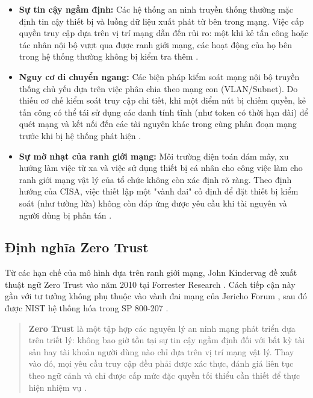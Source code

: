 \begin{itemize}
    \item \textbf{Sự tin cậy ngầm định:} Các hệ thống an ninh truyền thống thường mặc định tin cậy thiết bị và luồng dữ liệu xuất phát từ bên trong mạng. Việc cấp quyền truy cập dựa trên vị trí mạng dẫn đến rủi ro: một khi kẻ tấn công hoặc tác nhân nội bộ vượt qua được ranh giới mạng, các hoạt động của họ bên trong hệ thống thường không bị kiểm tra thêm \parencite{nist800207}.
    
    \item \textbf{Nguy cơ di chuyển ngang:} Các biện pháp kiểm soát mạng nội bộ truyền thống chủ yếu dựa trên việc phân chia theo mạng con (VLAN/Subnet). Do thiếu cơ chế kiểm soát truy cập chi tiết, khi một điểm nút bị chiếm quyền, kẻ tấn công có thể tái sử dụng các danh tính tĩnh (như token có thời hạn dài) để quét mạng và kết nối đến các tài nguyên khác trong cùng phân đoạn mạng trước khi bị hệ thống phát hiện \parencite{kindervag2010build,gilman2017zero}.
    
    \item \textbf{Sự mờ nhạt của ranh giới mạng:} Môi trường điện toán đám mây, xu hướng làm việc từ xa và việc sử dụng thiết bị cá nhân cho công việc làm cho ranh giới mạng vật lý của tổ chức không còn xác định rõ ràng. Theo định hướng của CISA, việc thiết lập một "vành đai" cố định để đặt thiết bị kiểm soát (như tường lửa) không còn đáp ứng được yêu cầu khi tài nguyên và người dùng bị phân tán \parencite{cisa_ztmm2023,nist800207}.
\end{itemize}

\subsection{Định nghĩa Zero Trust}

Từ các hạn chế của mô hình dựa trên ranh giới mạng, John Kindervag đề xuất thuật ngữ Zero Trust vào năm 2010 tại Forrester Research \parencite{kindervag2010build}. Cách tiếp cận này gần với tư tưởng không phụ thuộc vào vành đai mạng của Jericho Forum \parencite{jericho2004}, sau đó được NIST hệ thống hóa trong SP 800-207 \parencite{nist800207}.

\begin{quote}
\textbf{Zero Trust} là một tập hợp các nguyên lý an ninh mạng phát triển dựa trên triết lý: không bao giờ tồn tại sự tin cậy ngầm định đối với bất kỳ tài sản hay tài khoản người dùng nào chỉ dựa trên vị trí mạng vật lý. Thay vào đó, mọi yêu cầu truy cập đều phải được xác thực, đánh giá liên tục theo ngữ cảnh và chỉ được cấp mức đặc quyền tối thiểu cần thiết để thực hiện nhiệm vụ \parencite{nist800207}.
\end{quote}

